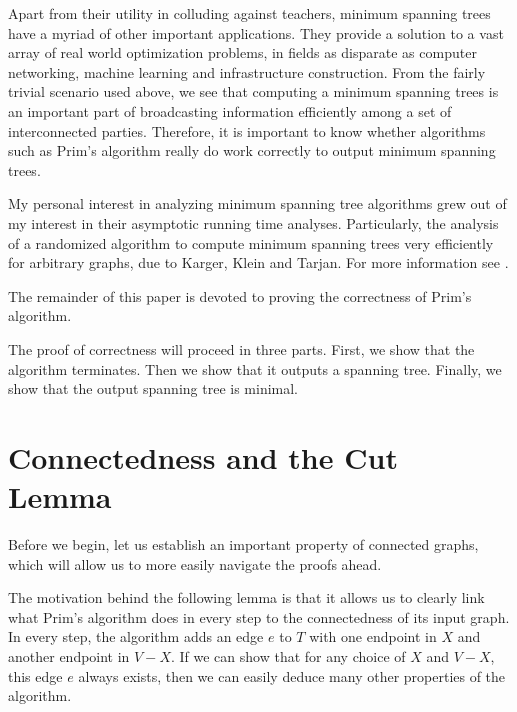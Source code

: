 \documentclass[a4paper,11pt]{report}
\theoremstyle{plain}
\theoremstyle{definition}
\begin{document}


Apart from their utility in colluding against teachers, minimum spanning trees
have a myriad of other important applications. They provide a solution to a
vast array of real world optimization problems, in fields as disparate as
computer networking, machine learning and infrastructure construction. From the
fairly trivial scenario used above, we see that computing a minimum spanning
trees is an important part of broadcasting information efficiently among a set
of interconnected parties. Therefore, it is important to know whether
algorithms such as Prim's algorithm really do work correctly to output minimum
spanning trees.

My personal interest in analyzing minimum spanning tree algorithms grew out of
my interest in their asymptotic running time analyses. Particularly, the
analysis of a randomized algorithm to compute minimum spanning trees very
efficiently for arbitrary graphs, due to Karger, Klein and Tarjan. For more
information see \cite{linear-rand-mst}.

The remainder of this paper is devoted to proving the correctness of
Prim's algorithm.

The proof of correctness will proceed in three parts. First, we show that the
algorithm terminates. Then we show that it outputs a spanning tree. Finally,
we show that the output spanning tree is minimal.

\section{Connectedness and the Cut Lemma}

Before we begin, let us establish an important property of connected graphs,
which will allow us to more easily navigate the proofs ahead.

The motivation behind the following lemma is that it allows us to clearly link
what Prim's algorithm does in every step to the connectedness of its
input graph. In every step, the algorithm adds an edge $e$ to $T$ with one
endpoint in $X$ and another endpoint in $V - X$. If we can show that for any
choice of $X$ and $V - X$, this edge $e$ always exists, then we can easily
deduce many other properties of the algorithm.
\end{document}
